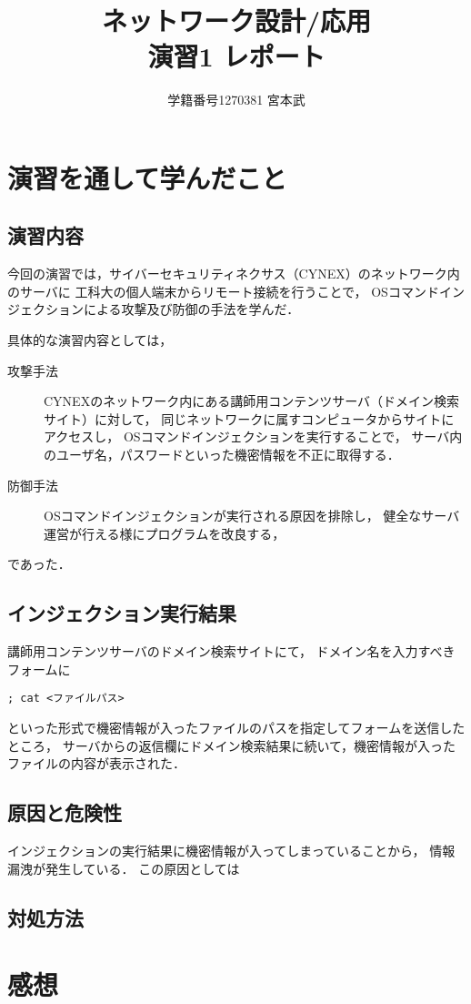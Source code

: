 \documentclass{jlreq}
\title{ネットワーク設計/応用 \\ \vspace{0.3cm} 演習1 レポート}
\author{学籍番号1270381 宮本武}
\begin{document}
\maketitle

\section{演習を通して学んだこと}
\subsection{演習内容}
今回の演習では，サイバーセキュリティネクサス（CYNEX）のネットワーク内のサーバに
工科大の個人端末からリモート接続を行うことで，
OSコマンドインジェクションによる攻撃及び防御の手法を学んだ．

具体的な演習内容としては，
\begin{description}
    \item[攻撃手法]
    CYNEXのネットワーク内にある講師用コンテンツサーバ（ドメイン検索サイト）に対して，
    同じネットワークに属すコンピュータからサイトにアクセスし，
    OSコマンドインジェクションを実行することで，
    サーバ内のユーザ名，パスワードといった機密情報を不正に取得する．

    \vspace{0.3cm}
    \item[防御手法] 
    OSコマンドインジェクションが実行される原因を排除し，
    健全なサーバ運営が行える様にプログラムを改良する，
\end{description}
であった．

\subsection{インジェクション実行結果}
講師用コンテンツサーバのドメイン検索サイトにて，
ドメイン名を入力すべきフォームに
\begin{lstlisting}[frame={tblr}]
; cat <ファイルパス>
\end{lstlisting}
といった形式で機密情報が入ったファイルのパスを指定してフォームを送信したところ，
サーバからの返信欄にドメイン検索結果に続いて，機密情報が入ったファイルの内容が表示された．
\subsection{原因と危険性}
インジェクションの実行結果に機密情報が入ってしまっていることから，
情報漏洩が発生している．
この原因としては

\subsection{対処方法}


\section{感想}
\end{document}
